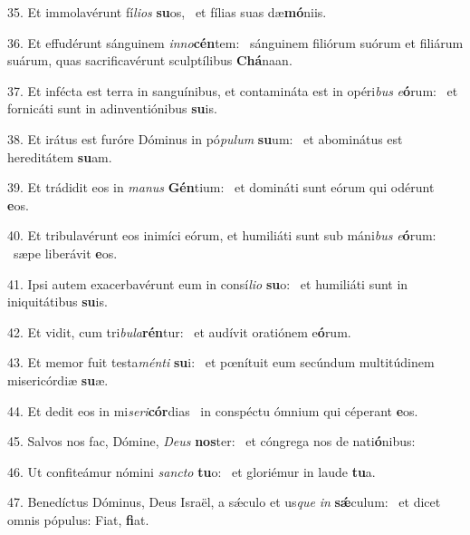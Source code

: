 35. Et immolavérunt fí\textit{li}\textit{os} \textbf{su}os, \ast\  et fílias suas dæ\textbf{mó}niis.\

36. Et effudérunt sánguinem \textit{in}\textit{no}\textbf{cén}tem: \ast\  sánguinem filiórum suórum et filiárum suárum, quas sacrificavérunt sculptílibus \textbf{Chá}naan.\

37. Et infécta est terra in sanguínibus, et contamináta est in opéri\textit{bus} \textit{e}\textbf{ó}rum: \ast\  et fornicáti sunt in adinventiónibus \textbf{su}is.\

38. Et irátus est furóre Dóminus in pó\textit{pu}\textit{lum} \textbf{su}um: \ast\  et abominátus est hereditátem \textbf{su}am.\

39. Et trádidit eos in \textit{ma}\textit{nus} \textbf{Gén}tium: \ast\  et domináti sunt eórum qui odérunt \textbf{e}os.\

40. Et tribulavérunt eos inimíci eórum, et humiliáti sunt sub máni\textit{bus} \textit{e}\textbf{ó}rum: \ast\  sæpe liberávit \textbf{e}os.\

41. Ipsi autem exacerbavérunt eum in consí\textit{li}\textit{o} \textbf{su}o: \ast\  et humiliáti sunt in iniquitátibus \textbf{su}is.\

42. Et vidit, cum tri\textit{bu}\textit{la}\textbf{rén}tur: \ast\  et audívit oratiónem e\textbf{ó}rum.\

43. Et memor fuit testa\textit{mén}\textit{ti} \textbf{su}i: \ast\  et pœnítuit eum secúndum multitúdinem misericórdiæ \textbf{su}æ.\

44. Et dedit eos in mi\textit{se}\textit{ri}\textbf{cór}dias \ast\  in conspéctu ómnium qui céperant \textbf{e}os.\

45. Salvos nos fac, Dómine, \textit{De}\textit{us} \textbf{nos}ter: \ast\  et cóngrega nos de nati\textbf{ó}nibus:\

46. Ut confiteámur nómini \textit{sanc}\textit{to} \textbf{tu}o: \ast\  et gloriémur in laude \textbf{tu}a.\

47. Benedíctus Dóminus, Deus Israël, a sǽculo et us\textit{que} \textit{in} \textbf{sǽ}culum: \ast\  et dicet omnis pópulus: Fiat, \textbf{fi}at.\

